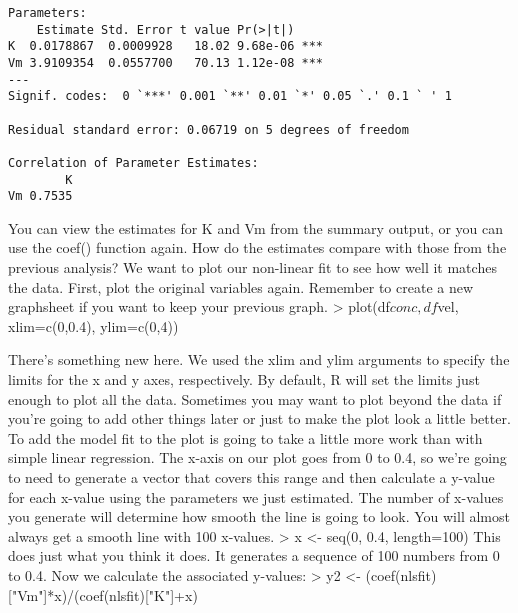 {\begin{framed}
\begin{verbatim}
Parameters:
    Estimate Std. Error t value Pr(>|t|)    
K  0.0178867  0.0009928   18.02 9.68e-06 ***
Vm 3.9109354  0.0557700   70.13 1.12e-08 ***
---
Signif. codes:  0 `***' 0.001 `**' 0.01 `*' 0.05 `.' 0.1 ` ' 1 

Residual standard error: 0.06719 on 5 degrees of freedom

Correlation of Parameter Estimates:
        K
Vm 0.7535 
\end{verbatim}
\end{framed}

You can view the estimates for K and Vm from the summary output, or you can use the coef() function again. How do the estimates compare with those from the previous analysis? We want to plot our non-linear fit to see how well it matches the data. First, plot the original variables again. Remember to create a new graphsheet if you want to keep your previous graph. 
> plot(df$conc, df$vel, xlim=c(0,0.4), ylim=c(0,4))


There's something new here. We used the xlim and ylim arguments to specify the limits for the x and y axes, respectively. By default, R will set the limits just enough to plot all the data. Sometimes you may want to plot beyond the data if you're going to add other things later or just to make the plot look a little better. 
To add the model fit to the plot is going to take a little more work than with simple linear regression. The x-axis on our plot goes from 0 to 0.4, so we're going to need to generate a vector that covers this range and then calculate a y-value for each x-value using the parameters we just estimated. The number of x-values you generate will determine how smooth the line is going to look. You will almost always get a smooth line with 100 x-values. 
> x <- seq(0, 0.4, length=100)
This does just what you think it does. It generates a sequence of 100 numbers from 0 to 0.4. Now we calculate the associated y-values: 
> y2 <- (coef(nlsfit)["Vm"]*x)/(coef(nlsfit)["K"]+x)


}
